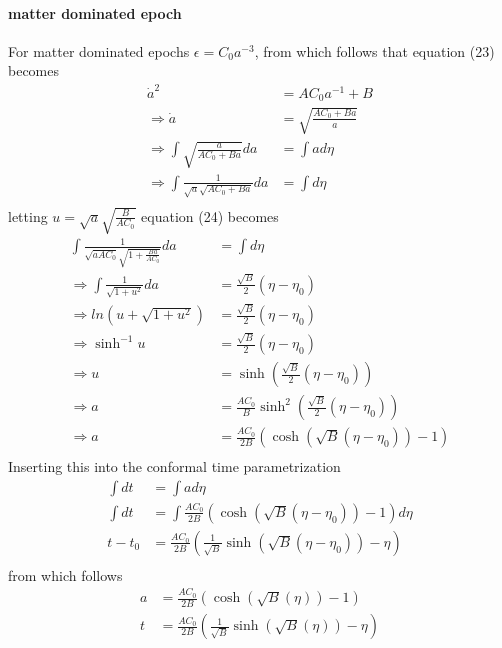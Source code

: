 \documentclass[a4paper, 11pt]{FSKH_623_Report}
\numberwithin{equation}{section}
\newcommand{\brac}[1]{\left(#1\right)}
\begin{document}
\paragraph*{matter dominated epoch}
For matter dominated epochs $\epsilon=C_{0}a^{-3}$, from which follows that equation (23) becomes
\begin{equation}
\begin{split}
\dot{a}^{2} &= AC_{0}a^{-1}+B\\
\Rightarrow \dot{a} &= \sqrt{\frac{AC_{0}+Ba}{a}}\\
\Rightarrow \int\sqrt{\frac{a}{AC_{0}+Ba}}da &= \int ad\eta \\
\Rightarrow \int\frac{1}{\sqrt{a}\sqrt{AC_{0}+Ba}}da &= \int d\eta \\
\end{split}
\end{equation}
letting $u=\sqrt{a}\sqrt{\frac{B}{AC_{0}}}$ equation (24) becomes
\begin{equation}
\begin{split}
\int\frac{1}{\sqrt{aAC_{0}}\sqrt{1+\frac{Ba}{AC_{0}}}}da &= \int d\eta \\
\Rightarrow \int\frac{1}{\sqrt{1+u^{2}}}da &= \frac{\sqrt{B}}{2}\brac{\eta-\eta_{0}}\\
\Rightarrow ln\brac{u+\sqrt{1+u^{2}}} &= \frac{\sqrt{B}}{2}\brac{\eta-\eta_{0}}\\
\Rightarrow \sinh^{-1}u &= \frac{\sqrt{B}}{2}\brac{\eta-\eta_{0}}\\
\Rightarrow u &= \sinh\brac{\frac{\sqrt{B}}{2}\brac{\eta-\eta_{0}}}\\
\Rightarrow a &= \frac{AC_{0}}{B}\sinh^{2}\brac{\frac{\sqrt{B}}{2}\brac{\eta-\eta_{0}}}\\
\Rightarrow a &= \frac{AC_{0}}{2B}\brac{\cosh\brac{\sqrt{B}\brac{\eta-\eta_{0}}}-1}\\
\end{split}
\end{equation}
Inserting this into the conformal time parametrization 
\begin{equation}
\begin{split}
\int dt &= \int ad\eta\\
\int dt &= \int \frac{AC_{0}}{2B}\brac{\cosh\brac{\sqrt{B}\brac{\eta-\eta_{0}}}-1} d\eta\\
t-t_{0} &= \frac{AC_{0}}{2B}\brac{\frac{1}{\sqrt{B}}\sinh\brac{\sqrt{B}\brac{\eta-\eta_{0}}}-\eta}\\
\end{split}
\end{equation}
from which follows
\begin{equation}
\begin{split}
a &= \frac{AC_{0}}{2B}\brac{\cosh\brac{\sqrt{B}\brac{\eta}}-1}\\
t &= \frac{AC_{0}}{2B}\brac{\frac{1}{\sqrt{B}}\sinh\brac{\sqrt{B}\brac{\eta}}-\eta}\\
\end{split}
\end{equation}
\end{document}
